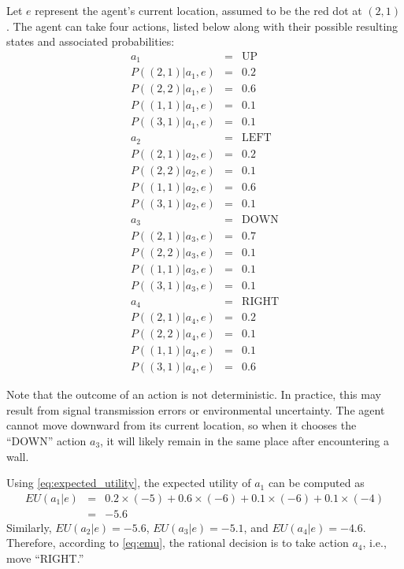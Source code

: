 Let $e$ represent the agent’s current location, assumed to be the red dot at $(2,1)$. The agent can take four actions, listed below along with their possible resulting states and associated probabilities:
\begin{eqnarray}
	a_1 &=& \mathrm{UP} \nonumber \\
	P((2,1)|a_1,e) &=& 0.2 \nonumber \\
	P((2,2)|a_1,e) &=& 0.6 \nonumber \\
	P((1,1)|a_1,e) &=& 0.1 \nonumber \\
	P((3,1)|a_1,e) &=& 0.1 \nonumber \\
	a_2 &=& \mathrm{LEFT} \nonumber \\
	P((2,1)|a_2,e) &=& 0.2 \nonumber \\
	P((2,2)|a_2,e) &=& 0.1 \nonumber \\
	P((1,1)|a_2,e) &=& 0.6 \nonumber \\
	P((3,1)|a_2,e) &=& 0.1 \nonumber \\
	a_3 &=& \mathrm{DOWN} \nonumber \\
	P((2,1)|a_3,e) &=& 0.7 \nonumber \\
	P((2,2)|a_3,e) &=& 0.1 \nonumber \\
	P((1,1)|a_3,e) &=& 0.1 \nonumber \\
	P((3,1)|a_3,e) &=& 0.1 \nonumber \\
	a_4 &=& \mathrm{RIGHT} \nonumber \\
	P((2,1)|a_4,e) &=& 0.2 \nonumber \\
	P((2,2)|a_4,e) &=& 0.1 \nonumber \\
	P((1,1)|a_4,e) &=& 0.1 \nonumber \\
	P((3,1)|a_4,e) &=& 0.6 \nonumber
\end{eqnarray}

Note that the outcome of an action is not deterministic. In practice, this may result from signal transmission errors or environmental uncertainty. The agent cannot move downward from its current location, so when it chooses the “DOWN” action $a_3$, it will likely remain in the same place after encountering a wall.

Using \eqref{eq:expected_utility}, the expected utility of $a_1$ can be computed as
\begin{eqnarray}
	EU(a_1|e) &=& 0.2 \times (-5) + 0.6 \times (-6) + 0.1 \times (-6) + 0.1 \times (-4) \nonumber \\
	&=& -5.6 \nonumber
\end{eqnarray}
Similarly, $EU(a_2|e) = -5.6$, $EU(a_3|e) = -5.1$, and $EU(a_4|e) = -4.6$. Therefore, according to \eqref{eq:emu}, the rational decision is to take action $a_4$, i.e., move “RIGHT.”

